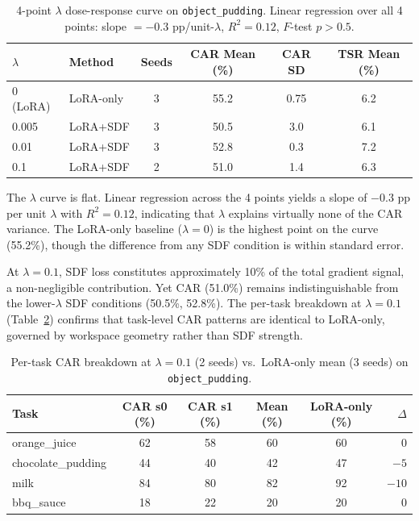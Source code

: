 \documentclass[10pt,letterpaper]{article}
\begin{document}
\begin{table}[t]
\centering
\caption{4-point $\lambda$ dose-response curve on \texttt{object\_pudding}. Linear regression over all 4 points: slope $= -0.3$ pp/unit-$\lambda$, $R^2 = 0.12$, $F$-test $p > 0.5$.}
\label{tab:lambda_curve}
\begin{tabular}{llcccc}
\toprule
$\lambda$ & Method & Seeds & CAR Mean (\%) & CAR SD & TSR Mean (\%) \\
\midrule
0 (LoRA) & LoRA-only & 3 & 55.2 & 0.75 & 6.2 \\
0.005 & LoRA+SDF & 3 & 50.5 & 3.0 & 6.1 \\
0.01 & LoRA+SDF & 3 & 52.8 & 0.3 & 7.2 \\
0.1 & LoRA+SDF & 2 & 51.0 & 1.4 & 6.3 \\
\bottomrule
\end{tabular}
\end{table}

The $\lambda$ curve is flat. Linear regression across the 4 points yields a slope of $-0.3$ pp per unit $\lambda$ with $R^2 = 0.12$, indicating that $\lambda$ explains virtually none of the CAR variance. The LoRA-only baseline ($\lambda = 0$) is the highest point on the curve (55.2\%), though the difference from any SDF condition is within standard error.

At $\lambda = 0.1$, SDF loss constitutes approximately 10\% of the total gradient signal, a non-negligible contribution. Yet CAR (51.0\%) remains indistinguishable from the lower-$\lambda$ SDF conditions (50.5\%, 52.8\%). The per-task breakdown at $\lambda = 0.1$ (Table~\ref{tab:lambda01_pertask}) confirms that task-level CAR patterns are identical to LoRA-only, governed by workspace geometry rather than SDF strength.

\begin{table}[t]
\centering
\caption{Per-task CAR breakdown at $\lambda = 0.1$ (2 seeds) vs.\ LoRA-only mean (3 seeds) on \texttt{object\_pudding}.}
\label{tab:lambda01_pertask}
\begin{tabular}{lccccr}
\toprule
Task & CAR s0 (\%) & CAR s1 (\%) & Mean (\%) & LoRA-only (\%) & $\Delta$ \\
\midrule
orange\_juice & 62 & 58 & 60 & 60 & 0 \\
chocolate\_pudding & 44 & 40 & 42 & 47 & $-5$ \\
milk & 84 & 80 & 82 & 92 & $-10$ \\
bbq\_sauce & 18 & 22 & 20 & 20 & 0 \\
\bottomrule
\end{tabular}
\end{table}
\end{document}
